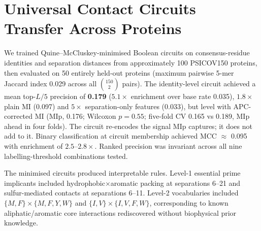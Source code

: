 \section{Universal Contact Circuits Transfer Across Proteins}
\label{sec:res-transfer}

We trained Quine--McCluskey-minimised Boolean circuits on consensus-residue
identities and separation distances from approximately 100 PSICOV150 proteins,
then evaluated on 50 entirely held-out proteins (maximum pairwise 5-mer
Jaccard index 0.029 across all $\binom{150}{2}$ pairs).  The identity-level
circuit achieved a mean top-$L/5$ precision of \textbf{0.179} ($5.1\times$
enrichment over base rate 0.035), $1.8\times$ plain MI (0.097) and $5\times$
separation-only features (0.033), but level with APC-corrected MI (MIp, 0.176; Wilcoxon $p = 0.55$; five-fold CV 0.165 vs 0.189, MIp ahead in four folds).  The circuit re-encodes
the signal MIp captures; it does not add to it.
Binary classification at circuit membership achieved MCC $\approx$ 0.095 with
enrichment of $2.5$--$2.8\times$.  Ranked precision was invariant across all
nine labelling-threshold combinations tested.

The minimised circuits produced interpretable rules.  Level-1 essential prime
implicants included hydrophobic$\times$aromatic packing at separations 6--21
and sulfur-mediated contacts at separations 6--11.  Level-2 vocabularies
included $\{M,F\}\times\{M,F,Y,W\}$ and $\{I,V\}\times\{I,V,F,W\}$,
corresponding to known aliphatic/aromatic core interactions rediscovered
without biophysical prior knowledge.
